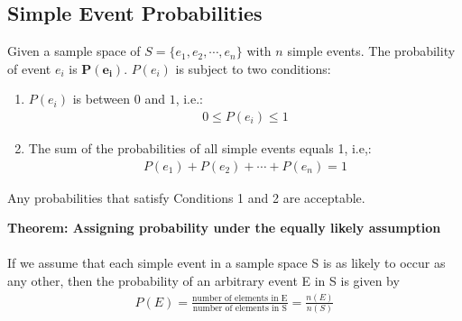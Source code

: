\documentclass[14pt]{extarticle}
\begin{document}
\subsection{Simple Event Probabilities}
\begin{tcolorbox}[enhanced jigsaw,colback=bg,boxrule=0pt,arc=0pt] 
	Given a sample space of $S = \{e_1, e_2, \cdots, e_n\}$ with $n$ simple events. The probability of event $e_i$ is $\mathbf{P(e_i)}$. $P(e_i)$ is subject to two conditions:
	\begin{enumerate}
		\item $P(e_i)$ is between $0$ and $1$, i.e.:
		\begin{align*}
			0 \leq P(e_i) \leq 1
		\end{align*}
		\item The sum of the probabilities of all simple events equals 1, i.e,:
		\begin{align*}
			P(e_1) + P(e_2) + \cdots + P(e_n) = 1
		\end{align*}
	\end{enumerate}
	Any probabilities that satisfy Conditions 1 and 2 are acceptable.
\end{tcolorbox}

\begin{tcolorbox}[enhanced jigsaw,colback=bg,boxrule=0pt,arc=0pt] 
	\textbf{Theorem: Assigning probability under the equally likely assumption} \\\\
	If we assume that each simple event in a sample space S is as likely to occur as any other, then the probability of an arbitrary event E in S is given by
	\begin{align*}
		P(E) = \frac{\text{number of elements in E}}{\text{number of elements in S}} = 
		\frac{n(E)}{n(S)}
	\end{align*}
\end{tcolorbox}
\end{document}
